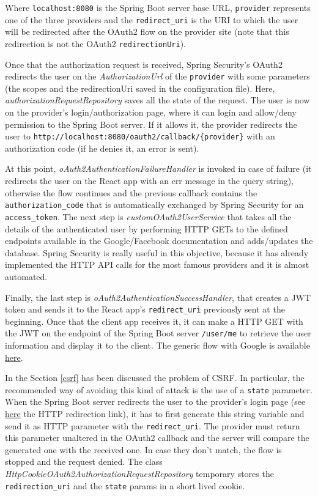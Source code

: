 \noindent Where \texttt{localhost:8080} is the Spring Boot server base URL, \texttt{provider} represents one of the three providers and the \texttt{redirect\_uri} is the URI to which the user will be redirected after the OAuth2 flow on the provider site (note that this redirection is not the OAuth2 \texttt{redirectionUri}).

Once that the authorization request is received, Spring Security's OAuth2 redirects the user on the \textit{AuthorizationUrl} of the \texttt{provider} with some parameters (the scopes and the redirectionUri saved in the configuration file). Here, \textit{authorizationRequestRepository} saves all the state of the request. The user is now on the provider's login/authorization page, where it can login and allow/deny permission to the Spring Boot server. If it allows it, the provider redirects the user to \texttt{http://localhost:8080/oauth2/callback/\{provider\}} with an authorization code (if he denies it, an error is sent).

At this point, \textit{oAuth2AuthenticationFailureHandler} is invoked in case of failure (it redirects the user on the React app with an err message in the query string), otherwise the flow continues and the previous callback contains the \texttt{authorization\_code} that is automatically exchanged by Spring Security for an \texttt{access\_token}. The next step is \textit{customOAuth2UserService} that takes all the details of the authenticated user by performing HTTP GETs to the defined endpoints available in the Google/Facebook documentation and adds/updates the database. Spring Security is really useful in this objective, because it has already implemented the HTTP API calls for the most famous providers and it is almost automated. 

Finally, the last step is \textit{oAuth2AuthenticationSuccessHandler}, that creates a JWT token and sends it to the React app's \texttt{redirect\_uri} previously sent at the beginning. Once that the client app receives it, it can make a HTTP GET with the JWT on the endpoint of the Spring Boot server \texttt{/user/me} to retrieve the user information and display it to the client. The generic flow with Google is available \href{https://github.com/nopesir/oauth-hw-security/releases/download/v0.5-alpha/flow.svg}{here}.


In the Section \ref{csrf} has been discussed the problem of CSRF. In particular, the recommended way of avoiding this kind of attack is the use of a \texttt{state} parameter. When the Spring Boot server redirects the user to the provider's login page (see \hyperlink{foo}{here} the HTTP redirection link), it has to first generate this string variable and send it as HTTP parameter with the \texttt{redirect\_uri}. The provider must return this parameter unaltered in the OAuth2 callback and the server will compare the generated one with the received one. In case they don't match, the flow is stopped and the request denied.
The class \textit{HttpCookieOAuth2AuthorizationRequestRepository} temporary stores the \texttt{redirection\_uri} and the \texttt{state} params in a short lived cookie.

